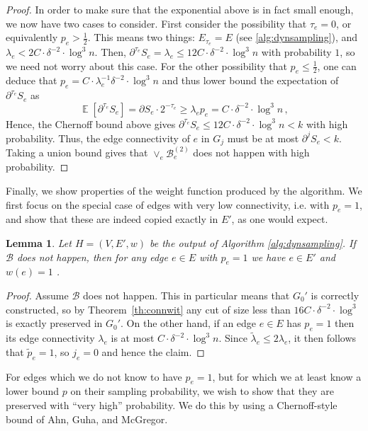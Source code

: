 \documentclass[epsfig,letter,11pt]{article}
\numberwithin{equation}{section}
\DeclareMathOperator{\ex}{\mathbb{E}}
\renewcommand{\tilde}{\widetilde}
\newtheorem{lemma}[theorem]{Lemma}
\begin{document}
\begin{proof}
	In order to make sure that the exponential above is in fact small enough, we now have two cases to consider. First consider the possibility that $\tau_e= 0$, or equivalently $p_e > \frac{1}{2}$. This means two things: $E_{\tau_e}=E$ (see \cref{alg:dynsampling}), and $\lambda_e < 2 C \cdot \delta^{-2}\cdot \log^3 n$. Then, $\partial^{\tau_e} S_e=\lambda_e \le 12 C \cdot \delta^{-2}\cdot \log^3 n$ with probability $1$, so we need not worry about this case. For the other possibility that $ p_e \le \frac{1}{2}$, one can deduce that $p_e = C \cdot \lambda_{e}^{-1} \delta^{-2}\cdot \log^3 n$ and thus lower bound the expectation of $\partial^{\tau_e} S_e$ as
	\begin{equation*}
		\ex[\partial^{\tau_e} S_e] = \partial S_e \cdot 2^{-\tau_e} \ge \lambda_e p_e = C \cdot \delta^{-2}\cdot \log^3 n \, ,
	\end{equation*}
	Hence, the Chernoff bound above gives $\partial^{\tau_e} S_e \le 12 C \cdot \delta^{-2}\cdot \log^3 n < k$ with high probability. Thus, the edge connectivity of $e$ in $G_{j}$ must be at most $\partial^{j} S_e < k$. Taking a union bound gives that $\vee_{e} \mathcal{B}^{(2)}_e$ does not happen with high probability.
\end{proof}

\noindent
Finally, we show properties of the weight function produced by the algorithm. We first focus on the special case of edges with very low connectivity, i.e. with $p_e=1$, and show that these are indeed copied exactly in $E'$, as one would expect.

\begin{lemma}
	\label{lem:oneprobsampling}
	Let $H=(V,E',w)$ be the output of Algorithm \ref{alg:dynsampling}. If $\mathcal{B}$ does not happen, then for any edge $e \in E$ with $p_e =1$ we have $e \in E'$ and $w(e)=1$ .
\end{lemma}
\begin{proof}
	Assume $\mathcal{B}$ does not happen. This in particular means that $G_0'$ is correctly constructed, so by Theorem~\ref{th:connwit} any cut of size less than $16C \cdot \delta^{-2}\cdot \log^3$ is exactly preserved in $G_0'$. On the other hand, if an edge $e \in E$ has $p_e = 1$ then its edge connectivity $\lambda_e$ is at most $C \cdot \delta^{-2}\cdot \log^3 n$. Since $\tilde{\lambda}_e \le 2 \lambda_e$, it then follows that $\tilde{p}_e = 1 $, so $j_e=0$ and hence the claim.
\end{proof}

\noindent
For edges which we do not know to have $p_e=1$, but for which we at least know a lower bound $p$ on their sampling probability, we wish to show that they are preserved with ``very high'' probability. We do this by using a Chernoff-style bound of Ahn, Guha, and McGregor.
\end{document}
